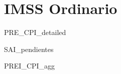 \documentclass{article}
\begin{document}
\section*{IMSS Ordinario}


{{PRE_CPI_detailed}}

{{SAI_pendientes}}

{{PREI_CPI_agg}}
\end{document}
